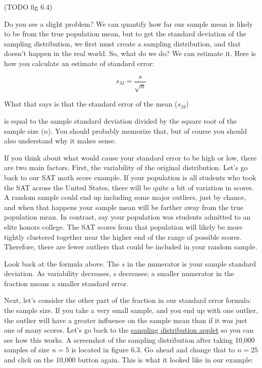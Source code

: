 \documentclass[
  letterpaper,
  DIV=11,
  numbers=noendperiod]{scrreprt}
\begin{document}
(TODO fig 6.4)

Do you see a slight problem? We can quantify how far our sample mean is
likely to be from the true population mean, but to get the standard
deviation of the sampling distribution, we first must create a sampling
distribution, and that doesn't happen in the real world. So, what do we
do? We can estimate it. Here is how you calculate an estimate of
standard error:

\[
s_M = \frac{s}{\sqrt{n}}
\]

What that says is that the standard error of the mean (\(s_M\))

is equal to the sample standard deviation divided by the square root of
the sample size (\(n\)). You should probably memorize that, but of
course you should also understand why it makes sense.

If you think about what would cause your standard error to be high or
low, there are two main factors. First, the variability of the original
distribution. Let's go back to our SAT math score example. If your
population is all students who took the SAT across the United States,
there will be quite a bit of variation in scores. A random sample could
end up including some major outliers, just by chance, and when that
happens your sample mean will be farther away from the true population
mean. In contrast, say your population was students admitted to an elite
honors college. The SAT scores from that population will likely be more
tightly clustered together near the higher end of the range of possible
scores. Therefore, there are fewer outliers that could be included in
your random sample.

Look back at the formula above. The \(s\) in the numerator is your
sample standard deviation. As variability decreases, s decreases; a
smaller numerator in the fraction means a smaller standard error.

Next, let's consider the other part of the fraction in our standard
error formula: the sample size. If you take a very small sample, and you
end up with one outlier, the outlier will have a greater influence on
the sample mean than if it was just one of many scores. Let's go back to
the
\href{https://onlinestatbook.com/stat_sim/sampling_dist/index.html}{sampling
distribution applet} so you can see how this works. A screenshot of the
sampling distribution after taking 10,000 samples of size \(n = 5\) is
located in figure 6.3. Go ahead and change that to \(n = 25\) and click
on the 10,000 button again. This is what it looked like in our example:
\end{document}
